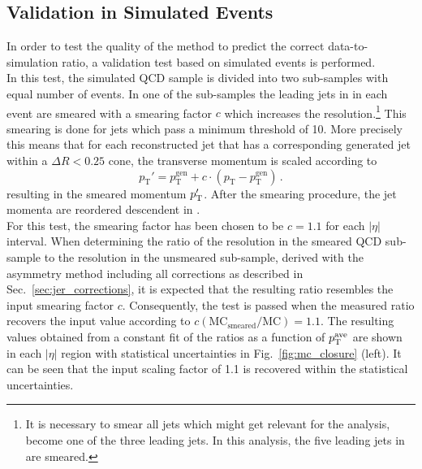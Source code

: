 \subsection{Validation in Simulated Events}
\label{sec:jer_validation_closure}
In order to test the quality of the method to predict the correct data-to-simulation ratio, a validation test based on simulated events is performed. \\ 
In this test, the simulated \pythia QCD sample is divided into two sub-samples with equal number of events. In one of the sub-samples the leading jets in \pt in each event are smeared with a smearing factor $c$ which increases the \pt resolution.\footnote{It is necessary to smear all jets which might get relevant for the analysis, \ie become one of the three leading jets. In this analysis, the five leading jets in \pt are smeared.} This smearing is done for jets which pass a minimum \pt threshold of 10\gev. More precisely this means that for each reconstructed jet that has a corresponding generated jet within a $\Delta R < 0.25$ cone, the transverse momentum is scaled according to
\begin{equation}
 p_\mathrm{T}' = p^\mathrm{gen}_\mathrm{T} + c \cdot (p_\mathrm{T} - p^\mathrm{gen}_\mathrm{T}) \, .
\label{eq:smear_gen}
\end{equation} 
resulting in the smeared momentum $p_{\text{T}}'$. After the smearing procedure, the jet momenta are reordered descendent in \pt.\\
For this test, the smearing factor has been chosen to be $c = 1.1$ for each $|\eta|$ interval. When determining the ratio of the resolution in the smeared QCD sub-sample to the resolution in the unsmeared sub-sample, derived with the asymmetry method including all corrections as described in Sec.~\ref{sec:jer_corrections}, it is expected that the resulting ratio resembles the input smearing factor $c$. Consequently, the test is passed when the measured ratio recovers the input value according to $c\mathrm{(MC_{smeared}/MC)} = 1.1$. The resulting values obtained from a constant fit of the ratios as a function of $p_{\text{T}}^\mathrm{ave}$ are shown in each $|\eta|$ region with statistical uncertainties in Fig.~\ref{fig:mc_closure} (left). It can be seen that the input scaling factor of 1.1 is recovered within the statistical uncertainties.

